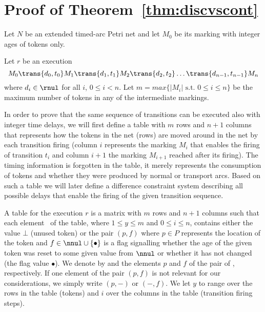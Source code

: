 \section{Proof of Theorem~\ref{thm:discvscont}} \label{app:cont}

Let $N$ be an extended timed-arc Petri net and let $M_0$ be its marking
with integer ages of tokens only.

Let $r$ be an execution 
\begin{equation}\label{eq:execution}
M_0 \trans{d_0,t_0} M_1 \trans{d_1,t_1} M_2 \trans{d_2,t_2} 
\ldots \trans{d_{n-1},t_{n-1}} M_{n}
\end{equation}
where $d_i \in \rnul$ for all $i$, $0 \leq i <n$.
Let $m=max\{|M_i| \text{ s.t. } 0 \leq i \leq n\}$ be the maximum number of
tokens in any of the intermediate markings.

In order to prove that the same sequence of transitions can be executed
also with integer time delays, we will first define a table
with $m$ rows and $n+1$ columns that represents how the tokens
in the net (rows) are moved around in the net by each transition firing
(column $i$ represents the marking $M_i$ that enables the firing of
transition $t_i$ and column $i+1$ the marking $M_{i+1}$ reached after its firing). 
The timing information is forgotten in the table, it merely represents
the consumption of tokens and whether they were produced by normal or
transport arcs. Based on such a table we will later define a difference
constraint system describing all possible delays that enable the firing
of the given transition sequence.

A table  for the execution $r$ is a matrix with $m$ rows and
$n+1$ columns such that each element \tai \ of the table, where 
$1 \leq y \leq m$ and $0 \leq i \leq n$, contains either the value 
$\bot$ (unused token) or the pair $(p,f)$ where $p \in P$ represents the location of the token
and $f \in \nnul \cup \{\bullet\}$ is a flag signalling whether
the age of the given token was reset to some given value from $\nnul$
or whether it has not changed (the flag value $\bullet$).
We denote by \taip and \taif
the elements $p$ and $f$ of the pair of \tai, respectively.
If one element of the pair $(p,f)$ is not relevant for our considerations,
we simply write $(p,-)$ or $(-,f)$. We let $y$ to range over
the rows in the table (tokens) and $i$ over the columns in the table
(transition firing steps).

